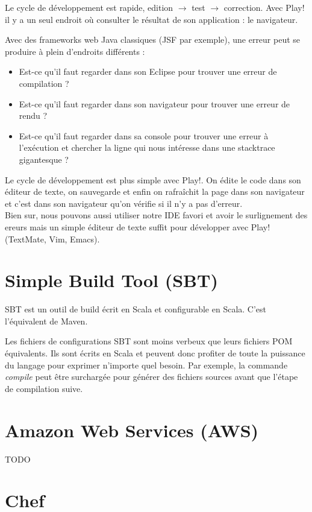 Le cycle de développement est rapide, edition $\rightarrow$ test $\rightarrow$ correction.
Avec Play! il y a un seul endroit où consulter le résultat de son
application : le navigateur. 

Avec des frameworks web Java classiques (JSF par exemple), une erreur peut se
produire à plein d'endroits différents :
\begin{itemize}
\item Est-ce qu'il faut regarder dans son Eclipse pour trouver une erreur de
  compilation ?
\item Est-ce qu'il faut regarder dans son navigateur pour trouver une erreur de
  rendu ?
\item Est-ce qu'il faut regarder dans sa console pour trouver une erreur à
  l'exécution et chercher la ligne qui nous intéresse dans une stacktrace
  gigantesque ? 
\end{itemize}

\bigskip

Le cycle de développement est plus simple avec Play!.
On édite le code dans son éditeur de texte, on sauvegarde et enfin on rafraîchit
la page dans son navigateur et c'est dans son navigateur qu'on vérifie si il n'y
a pas d'erreur. \\
Bien sur, nous pouvons aussi utiliser notre IDE favori et avoir le
surlignement des ereurs mais un simple éditeur de texte suffit pour développer
avec Play! (TextMate, Vim, Emacs).

\section{Simple Build Tool (SBT)}

SBT est un outil de build écrit en Scala et configurable en Scala.
C'est l'équivalent de Maven.  

Les fichiers de configurations SBT sont moins verbeux que leurs fichiers POM
équivalents. Ils sont écrits en Scala et peuvent donc profiter de toute la
puissance du langage pour exprimer n'importe quel besoin. Par exemple, 
la commande \textit{compile} peut être surchargée pour générer des fichiers sources avant
que l'étape de compilation suive.

\section{Amazon Web Services (AWS)}
TODO
\section{Chef}

